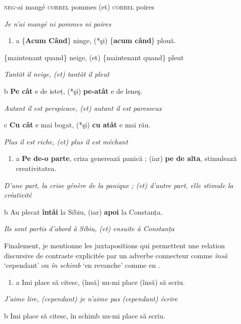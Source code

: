     \textsc{neg-}ai  mangé  \textsc{correl } pommes  (et)  \textsc{correl}  poires

    \textit{Je n'ai mangé ni pommes ni poires}


\begin{enumerate}
\item \label{bkm:Ref273696343}a  \{\textbf{Acum {\textbar} Când}\}  ninge,  (*şi)  \{\textbf{acum {\textbar} când}\}  plouă.


\end{enumerate}
  \{maintenant {\textbar} quand\}  neige,  (et)  \{maintenant {\textbar} quand\}  pleut

{\itshape
Tantôt il neige, (et) tantôt il pleut}

  b  \textbf{Pe cât} e de isteț, (*şi) \textbf{pe-atât} e de leneş.

{\itshape
Autant il est perspicace, (et) autant il est paresseux}

  c  \textbf{Cu cât} e mai bogat, (*şi) \textbf{cu atât} e mai rău.

{\itshape
Plus il est riche, (et) plus il est méchant}


\begin{enumerate}
\item \label{bkm:Ref301458990}a  \textbf{Pe de-o parte}, criza generează panică ; (iar) \textbf{pe de alta}, stimulează creativitatea.


\end{enumerate}
{\itshape
D'une part, la crise génère de la panique ; (et) d'autre part, elle stimule la créativité}

 b  Au plecat \textbf{întâi} la Sibiu, (iar) \textbf{apoi} la Constanța.

    \textit{Ils sont partis d'abord à Sibiu, (et) ensuite à Constanța}

Finalement, je mentionne les juxtapositions qui permettent une relation discursive de contraste explicitée par un adverbe connecteur comme \textit{însă} `cependant' ou \textit{în schimb} `en revanche' comme en . 


\begin{enumerate}
\item \label{bkm:Ref301447062}a  Imi place să citesc, (însă) nu-mi place (însă) să scriu.


\end{enumerate}
{\itshape
J'aime lire, (cependant) je n'aime pas (cependant) écrire}

  b  Imi place să citesc, în schimb nu-mi place să scriu.


